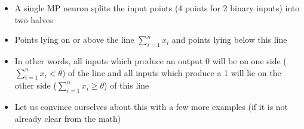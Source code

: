 \documentclass[serif, aspectratio=169]{beamer}
\begin{document}
\begin{frame}
\begin{columns}
\begin{overlayarea}{\textwidth}{\textheight}
\begin{itemize}\justifying
\item<4-> A single MP neuron splits the input points (4 points for 2 binary inputs) into two halves
\item<5-> Points lying on or above the line $\sum_{i=1}^{n} x_i$ and points lying below this line
\item<6-> In other words, all inputs which produce an output 0 will be on one side ($\sum_{i=1}^{n} x_i < \theta$) of the line and all inputs which produce a 1 will lie on the other side ($\sum_{i=1}^{n} x_i \geq \theta$) of this line 
\item<7-> Let us convince ourselves about this with a few more examples (if it is not already clear from the math) 
\end{itemize}
\end{overlayarea}
\end{columns}
\end{frame}
\end{document}
